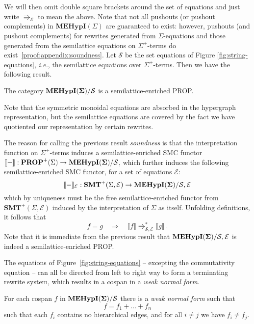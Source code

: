 We will then omit double square brackets around the set of equations and just write $\Rrightarrow_{\mathcal{E}}$ to mean the above.
Note that not all pushouts (or pushout complements) in $\textbf{MEHypI}(\Sigma)$ are guaranteed to exist: however,  pushouts (and pushout complements) for rewrites generated from $\Sigma$-equations and those generated from the semilattice equations on $\Sigma^+$-terms do exist~\ref{proof:appendix:soundness}.
Let $\mathcal{S}$ be the set equations of Figure \ref{fig:string-equations},  \textit{i.e.},  the semilattice equations over $\Sigma^+$-terms. 
Then we have the following result. 
\begin{proposition}[Soundness]
\label{prop:soundness}
The category ${\mathbf{MEHypI(\Sigma)}}/{\mathcal{S}}$ is a semilattice-enriched PROP. 
\end{proposition}
Note that the symmetric monoidal equations are absorbed in the hypergraph representation,  but the semilattice equations are covered by the fact we have quotiented our representation by certain rewrites. 

The reason for calling the previous result \textit{soundness} is that the interpretation function on $\Sigma^+$-terms induces a semilattice-enriched SMC functor $\llbracket - \rrbracket: \textbf{PROP}^+(\Sigma) \to {\mathbf{MEHypI(\Sigma)}}/{\mathcal{S}}$,  which further induces the following semilattice-enriched SMC functor,  for a set of equations $\mathcal E$:
\[
	\llbracket - \rrbracket_{\mathcal E}: \textbf{SMT}^+(\Sigma, \mathcal E) \to {\mathbf{MEHypI(\Sigma)}}/{\mathcal{S,E}}
\]
which by uniqueness must be the free semilattice-enriched functor from $\textbf{SMT}^+(\Sigma, \mathcal E)$ induced by the interpretation of $\Sigma$ as itself.  Unfolding definitions,  it follows that
\[
	f = g \quad \Rightarrow \quad \llbracket f \rrbracket \Rrightarrow^{*}_{\mathcal{S}, \mathcal{E}} \llbracket g \rrbracket~ . 
\]
Note that it is immediate from the previous result that ${\mathbf{MEHypI(\Sigma)}}/{\mathcal{S,E}}$ is indeed a semilattice-enriched PROP.  

The equations of Figure~\ref{fig:string-equations} -- excepting the commutativity equation -- can all be directed from left to right way to form a terminating rewrite system,  which results in a cospan in a \textit{weak normal form}. 
\begin{proposition}
\label{prop:wnormal_form}
For each cospan $f$ in ${{\mathbf{MEHypI(\Sigma)}}}/{\mathcal{S}}$ there is a \textit{weak normal form} such that 
\[
	f = f_1 + \ldots + f_n
\]
 such that each $f_i$ contains no hierarchical edges,  and for all $i \neq j$ we have $f_i \neq f_j$.
\end{proposition}

